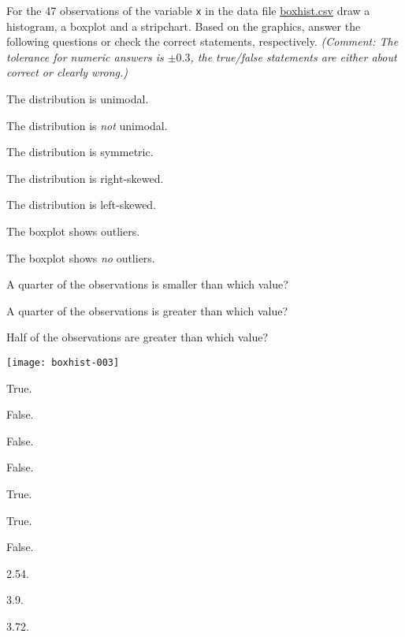 
\begin{question}
For the 47 observations of the variable \texttt{x} in the data file
\url{boxhist.csv} draw a histogram, a boxplot and a stripchart.
Based on the graphics, answer the following questions or check the correct
statements, respectively. \emph{(Comment: The tolerance for numeric answers is
$\pm0.3$, the true/false statements are either about correct or clearly wrong.)}
\begin{answerlist}
  \item The distribution is unimodal.
  \item The distribution is \emph{not} unimodal.
  \item The distribution is symmetric.
  \item The distribution is right-skewed.
  \item The distribution is left-skewed.
  \item The boxplot shows outliers.
  \item The boxplot shows \emph{no} outliers.
  \item A quarter of the observations is smaller than which value?
  \item A quarter of the observations is greater than which value?
  \item Half of the observations are greater than which value?
\end{answerlist}
\end{question}

\begin{solution}
\texttt{[image: boxhist-003]}

\begin{answerlist}
  \item True.
  \item False.
  \item False.
  \item False.
  \item True.
  \item True.
  \item False.
  \item 2.54.
  \item 3.9.
  \item 3.72.
\end{answerlist}
\end{solution}

